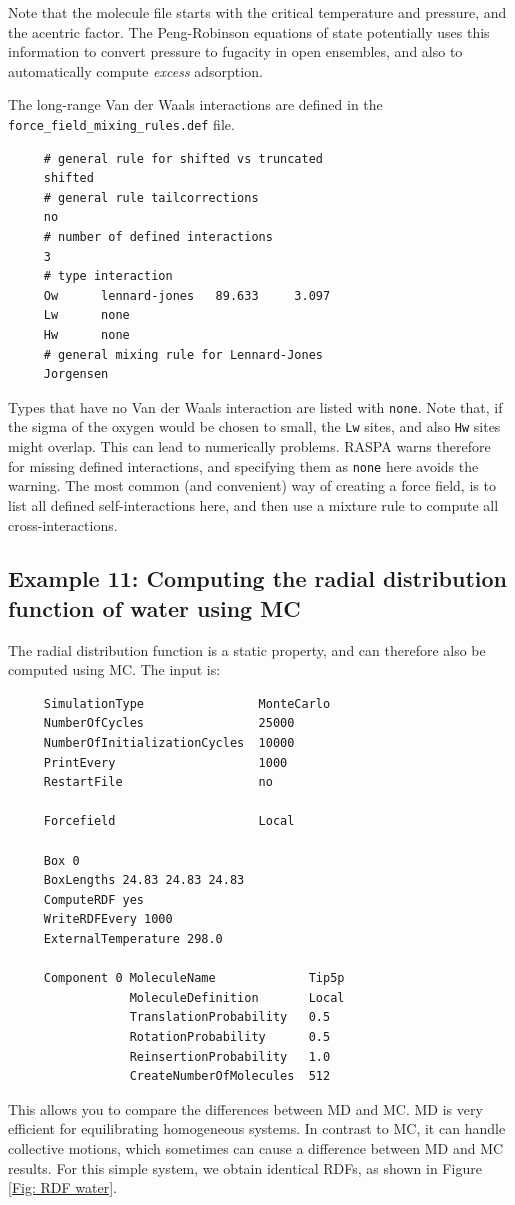 Note that the molecule file starts with the critical temperature and pressure, and the acentric factor.
The Peng-Robinson equations of state potentially uses this information to convert pressure to fugacity in open ensembles,
and also to automatically compute \emph{excess }adsorption.

The long-range Van der Waals interactions are defined in the \verb+force_field_mixing_rules.def+ file.
\begin{tiny}
\begin{verbatim}
     # general rule for shifted vs truncated
     shifted
     # general rule tailcorrections
     no
     # number of defined interactions
     3
     # type interaction
     Ow      lennard-jones   89.633     3.097
     Lw      none
     Hw      none
     # general mixing rule for Lennard-Jones
     Jorgensen
\end{verbatim}
\end{tiny}
Types that have no Van der Waals interaction are listed with \verb+none+. Note that, if the sigma of the oxygen 
would be chosen to small, the \verb+Lw+ sites, and also \verb+Hw+ sites might overlap.
This can lead to numerically problems. RASPA warns therefore for missing defined interactions, and specifying them as \verb+none+ here avoids the warning.
The most common (and convenient) way of creating a force field, is to list all defined self-interactions here, and then use a mixture rule to compute
all cross-interactions.


\subsection*{Example 11: Computing the radial distribution function of water using MC}

The radial distribution function is a static property, and can therefore also be computed using MC.
The input is:
\begin{tiny}
\begin{verbatim}
     SimulationType                MonteCarlo
     NumberOfCycles                25000
     NumberOfInitializationCycles  10000
     PrintEvery                    1000
     RestartFile                   no
     
     Forcefield                    Local
     
     Box 0
     BoxLengths 24.83 24.83 24.83
     ComputeRDF yes
     WriteRDFEvery 1000
     ExternalTemperature 298.0
     
     Component 0 MoleculeName             Tip5p
                 MoleculeDefinition       Local
                 TranslationProbability   0.5
                 RotationProbability      0.5
                 ReinsertionProbability   1.0
                 CreateNumberOfMolecules  512
\end{verbatim}
\end{tiny}
This allows you to compare the differences between MD and MC. MD is very efficient for equilibrating homogeneous systems.
In contrast to MC, it can handle collective motions, which sometimes can cause a difference between MD and MC results.
For this simple system, we obtain identical RDFs, as shown in Figure \ref{Fig: RDF water}.

